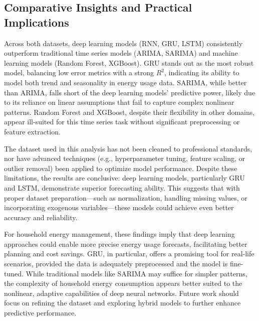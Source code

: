 \subsection{Comparative Insights and Practical Implications}
Across both datasets, deep learning models (RNN, GRU, LSTM) consistently outperform traditional time series models (ARIMA, SARIMA) and machine learning models (Random Forest, XGBoost). GRU stands out as the most robust model, balancing low error metrics with a strong $R^2$, indicating its ability to model both trend and seasonality in energy usage data. SARIMA, while better than ARIMA, falls short of the deep learning models’ predictive power, likely due to its reliance on linear assumptions that fail to capture complex nonlinear patterns. Random Forest and XGBoost, despite their flexibility in other domains, appear ill-suited for this time series task without significant preprocessing or feature extraction.

The dataset used in this analysis has not been cleaned to professional standards, nor have advanced techniques (e.g., hyperparameter tuning, feature scaling, or outlier removal) been applied to optimize model performance. Despite these limitations, the results are conclusive: deep learning models, particularly GRU and LSTM, demonstrate superior forecasting ability. This suggests that with proper dataset preparation—such as normalization, handling missing values, or incorporating exogenous variables—these models could achieve even better accuracy and reliability.

For household energy management, these findings imply that deep learning approaches could enable more precise energy usage forecasts, facilitating better planning and cost savings. GRU, in particular, offers a promising tool for real-life scenarios, provided the data is adequately preprocessed and the model is fine-tuned. While traditional models like SARIMA may suffice for simpler patterns, the complexity of household energy consumption appears better suited to the nonlinear, adaptive capabilities of deep neural networks. Future work should focus on refining the dataset and exploring hybrid models to further enhance predictive performance.


